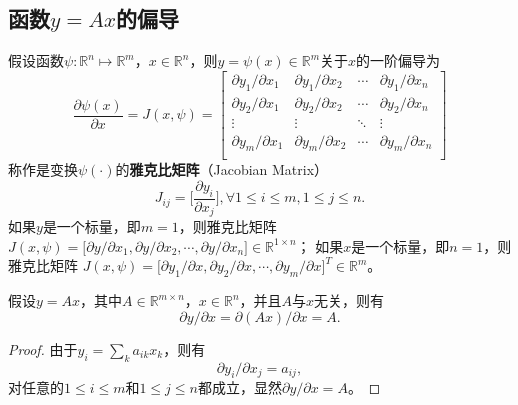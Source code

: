 \subsection{函数$y=Ax$的偏导}
\begin{definition}
假设函数$\psi:\mathbb R^n \mapsto \mathbb R^m$，$x\in \mathbb R^n$，则$y=\psi(x)\in \mathbb R^m$关于$x$的一阶偏导为
\begin{equation}
    \frac{\partial \psi(x)}{\partial x} = J(x,\psi) =
    \begin{bmatrix}
        \partial y_1/\partial x_1 & \partial y_1/\partial x_2 & \cdots & \partial y_1/\partial x_n\\
        \partial y_2/\partial x_1 & \partial y_2/\partial x_2 & \cdots & \partial y_2/\partial x_n\\
        \vdots & \vdots & \ddots & \vdots\\
        \partial y_m/\partial x_1 & \partial y_m/\partial x_2 & \cdots & \partial y_m/\partial x_n\\
    \end{bmatrix}
\end{equation}
称作是变换$\psi(\cdot)$的\textbf{雅克比矩阵}（Jacobian Matrix）
\begin{equation}
    J_{ij} = \Bigg[\frac{\partial y_i}{\partial x_j}\Bigg], \forall 1\le i \le m, 1\le j \le n.
\end{equation}
如果$y$是一个标量，即$m=1$，则雅克比矩阵
$J(x,\psi) = \big[\partial y/\partial x_1, \partial y/\partial x_2, \cdots,\partial y/\partial x_n\big]\in \mathbb R^{1\times n}$；
如果$x$是一个标量，即$n=1$，则雅克比矩阵
$J(x,\psi) = \big[\partial y_1/\partial x, \partial y_2/\partial x, \cdots,\partial y_m/\partial x\big]^T \in \mathbb R^m$。
\end{definition}

\begin{proposition}
假设$y=Ax$，其中$A\in \mathbb R^{m\times n}$，$x\in \mathbb R^n$，并且$A$与$x$无关，则有
\begin{equation}
    \partial y/\partial x = \partial (Ax)/\partial x = A.
\end{equation}

\begin{proof}
由于$y_i=\sum\limits_k a_{ik} x_k$，则有
\[
    \partial y_i/\partial x_j = a_{ij},
\]
对任意的$1\le i \le m$和$1\le j\le n$都成立，显然$\partial y/\partial x = A$。
\end{proof}
\end{proposition}

